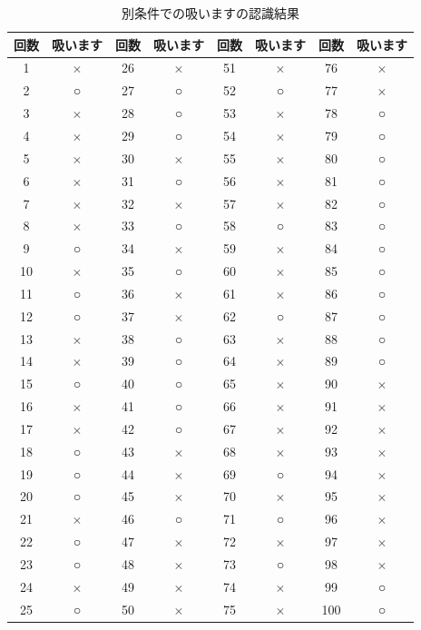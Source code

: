 \documentclass[12pt,oneside]{sotsuken_paper}
\begin{document}
\begin{table}[htb]
\begin{center}
\caption{別条件での吸いますの認識結果}
\begin{tabular}{|c|c|c|c|c|c|c|c|}\hline
回数&吸います&回数&吸います&回数&吸います&回数&吸います\\\hline
1&$\times$&26&$\times$&51&$\times$&76&$\times$\\\hline
2&○&27&○&52&○&77&$\times$\\\hline
3&$\times$&28&○&53&$\times$&78&○\\\hline
4&$\times$&29&○&54&$\times$&79&○\\\hline
5&$\times$&30&$\times$&55&$\times$&80&○\\\hline
6&$\times$&31&○&56&$\times$&81&○\\\hline
7&$\times$&32&$\times$&57&$\times$&82&○\\\hline
8&$\times$&33&○&58&○&83&○\\\hline
9&○&34&$\times$&59&$\times$&84&○\\\hline
10&$\times$&35&○&60&$\times$&85&○\\\hline
11&○&36&$\times$&61&$\times$&86&○\\\hline
12&○&37&$\times$&62&○&87&○\\\hline
13&$\times$&38&○&63&$\times$&88&○\\\hline
14&$\times$&39&○&64&$\times$&89&○\\\hline
15&○&40&○&65&$\times$&90&$\times$\\\hline
16&$\times$&41&○&66&$\times$&91&$\times$\\\hline
17&$\times$&42&○&67&$\times$&92&$\times$\\\hline
18&○&43&$\times$&68&$\times$&93&$\times$\\\hline
19&○&44&$\times$&69&○&94&$\times$\\\hline
20&○&45&$\times$&70&$\times$&95&$\times$\\\hline
21&$\times$&46&○&71&○&96&$\times$\\\hline
22&○&47&$\times$&72&$\times$&97&$\times$\\\hline
23&○&48&$\times$&73&○&98&$\times$\\\hline
24&$\times$&49&$\times$&74&$\times$&99&○\\\hline
25&○&50&$\times$&75&$\times$&100&○
\\\hline
\end{tabular}
\label{tab:another-yeahsmokrecogresult}
\end{center}
\end{table}
\end{document}
